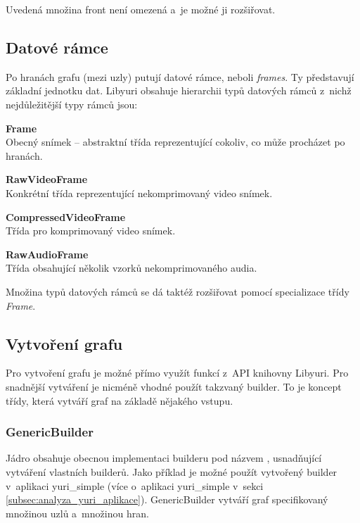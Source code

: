 \documentclass[thesis=M,czech]{FITthesis}[2012/06/26]
\begin{document}
Uvedená množina front není omezená a~je možné ji rozšiřovat.

\subsection{Datové rámce} \label{subsec:analyza_yuri_ramce}
Po hranách grafu (mezi uzly) putují datové rámce, neboli \textit{frames}. Ty představují základní jednotku dat. Libyuri obsahuje hierarchii typů datových rámců z~nichž nejdůležitější typy rámců jsou:
\begin{description}
  \item \textbf{Frame\\}
Obecný snímek -- abstraktní třída reprezentující cokoliv, co může procházet po hranách.
  \item \textbf{RawVideoFrame\\}
Konkrétní třída reprezentující nekomprimovaný video snímek. 
  \item \textbf{CompressedVideoFrame \\}
Třída pro komprimovaný video snímek.
  \item \textbf{RawAudioFrame\\}
Třída obsahující několik vzorků nekomprimovaného audia.
\end{description}

Množina typů datových rámců se dá taktéž rozšiřovat pomocí specializace třídy \textit{Frame}.

\subsection{Vytvoření grafu} \label{subsec:analyza_yuri_vytvoreni}
Pro vytvoření grafu je možné přímo využít funkcí z~API knihovny Libyuri. Pro snadnější vytváření je nicméně vhodné použít takzvaný builder. To je koncept třídy, která vytváří graf na základě nějakého vstupu. 

\subsubsection{GenericBuilder} \label{subsec:analyza_yuri_vytvoreni_generic}
Jádro obsahuje obecnou implementaci builderu pod názvem , usnadňující vytváření vlastních builderů. Jako příklad je možné použít vytvořený builder  v~aplikaci yuri\_simple (více o~aplikaci yuri\_simple v~sekci \ref{subsec:analyza_yuri_aplikace}). GenericBuilder vytváří graf specifikovaný množinou uzlů a~množinou hran.
\end{document}
